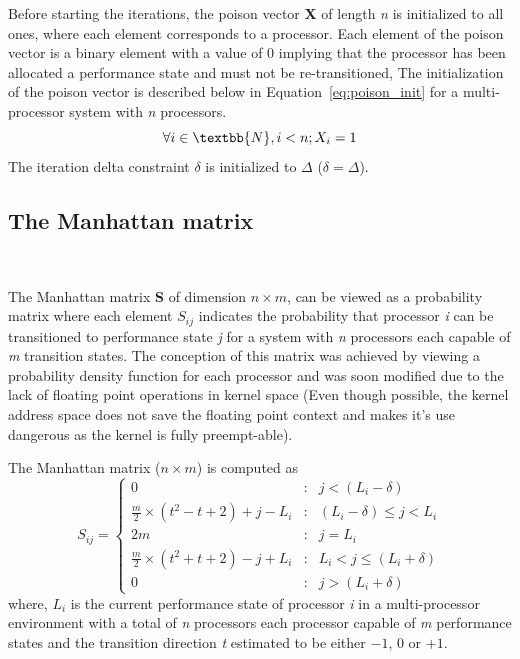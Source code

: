 Before starting the iterations, the poison vector \textbf{X} of length \textit{n} is initialized to all ones, where
each element corresponds to a processor. Each element of the poison vector is a binary element with a value of 0 
implying that the processor has been allocated a performance state and must not be re-transitioned, The initialization
of the poison vector is described below in Equation~\eqref{eq:poison_init} for a multi-processor system with \textit{n} processors.
\begin{equation}
    \forall i \in \textbb{N}, i < n; X_{i} = 1 
\label{eq:poison_init}
\end{equation}
The iteration delta constraint $\delta$ is initialized to $\Delta$  ($\delta = \Delta$). 

\subsection{The Manhattan matrix}~\label{sec:delta_matrix}

The Manhattan matrix \textbf{S} of dimension $n \times m$, can be viewed as a probability matrix where each element
$S_{ij}$ indicates the probability that processor \textit{i} can be transitioned to
performance state \textit{j} for a system with \textit{n} processors each 
capable of \textit{m} transition states. The conception of this matrix was achieved by viewing
a probability density function for each processor and was soon modified due to the lack of floating point operations in kernel space 
(Even though possible, the kernel address space does not save the floating point 
context and makes it's use dangerous as the kernel is fully preempt-able).

The Manhattan matrix ($n \times m$) is computed as
\begin{equation}
    S_{ij} = \left\{
     \begin{array}{lcr}
       0 & : & j < (L_{i} - \delta) \\
       \frac{m}{2} \times (t^{2} - t + 2) + j - L_{i} & : & (L_{i} - \delta) \leq j < L_{i} \\
       2m & : & j = L_{i}\\
       \frac{m}{2} \times (t^{2} + t + 2) - j + L_{i} & : & L_{i} < j \leq (L_{i} + \delta) \\
       0 & : & j > (L_{i} + \delta)
     \end{array}
   \right.
\label{eq:delta_mat}
\end{equation}
where, $L_i$ is the current performance state of processor \textit{i} in a multi-processor environment 
with a total of \textit{n} processors each processor capable of \textit{m} performance states 
and the transition direction \textit{t} estimated to be either $-1$, $0$ or $+1$. 

